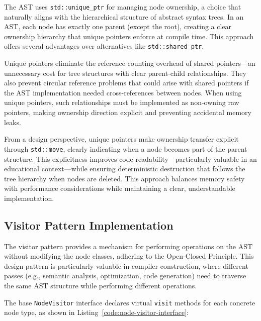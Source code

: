 The AST uses \texttt{std::unique\_ptr} for managing node ownership, a choice that naturally aligns with the hierarchical structure of abstract syntax trees. In an AST, each node has exactly one parent (except the root), creating a clear ownership hierarchy that unique pointers enforce at compile time. This approach offers several advantages over alternatives like \texttt{std::shared\_ptr}.

Unique pointers eliminate the reference counting overhead of shared pointers—an unnecessary cost for tree structures with clear parent-child relationships. They also prevent circular reference problems that could arise with shared pointers if the AST implementation needed cross-references between nodes. When using unique pointers, such relationships must be implemented as non-owning raw pointers, making ownership direction explicit and preventing accidental memory leaks.

From a design perspective, unique pointers make ownership transfer explicit through \texttt{std::move}, clearly indicating when a node becomes part of the parent structure. This explicitness improves code readability—particularly valuable in an educational context—while ensuring deterministic destruction that follows the tree hierarchy when nodes are deleted. This approach balances memory safety with performance considerations while maintaining a clear, understandable implementation.


\subsection{Visitor Pattern Implementation}

The visitor pattern provides a mechanism for performing operations on the AST without modifying the node classes, adhering to the Open-Closed Principle. This design pattern is particularly valuable in compiler construction, where different passes (e.g., semantic analysis, optimization, code generation) need to traverse the same AST structure while performing different operations.

The base \texttt{NodeVisitor} interface declares virtual \texttt{visit} methods for each concrete node type, as shown in Listing~\ref{code:node-visitor-interface}:

